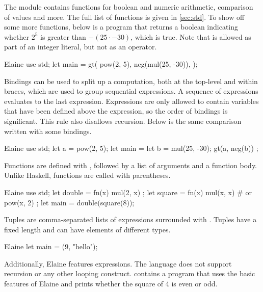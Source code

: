 The  module contains functions for boolean and numeric arithmetic, comparison of values and more. The full list of functions is given in \cref{sec:std}. To show off some more functions, below is a program that returns a boolean indicating whether $2^5$ is greater than $- (25 \cdot -30)$, which is true. Note that \el{-} is allowed as part of an integer literal, but not as an operator.

\begin{lst}{Elaine}
use std;
let main = gt(
    pow(2, 5),
    neg(mul(25, -30)),
);
\end{lst}

Bindings can be used to split up a computation, both at the top-level and within braces, which are used to group sequential expressions. A sequence of expressions evaluates to the last expression. Expressions are only allowed to contain variables that have been defined above the expression, so the order of bindings is significant. This rule also disallows recursion. Below is the same comparison written with some bindings.

\begin{lst}{Elaine}
use std;
let a = pow(2, 5);
let main = {
    let b = mul(25, -30);
    gt(a, neg(b))
};
\end{lst}

Functions are defined with , followed by a list of arguments and a function body. Unlike Haskell, functions are called with parentheses.

\begin{lst}{Elaine}
use std;
let double = fn(x) {
    mul(2, x)
};
let square = fn(x) {
    mul(x, x) # or pow(x, 2)
};
let main = double(square(8));
\end{lst}

Tuples are comma-separated lists of expressions surrounded with \el{()}. Tuples have a fixed length and can have elements of different types.

\begin{lst}{Elaine}
let main = (9, "hello");
\end{lst}

Additionally, Elaine features  expressions. The language does not support recursion or any other looping construct.  contains a program that uses the basic features of Elaine and prints whether the square of 4 is even or odd. 


